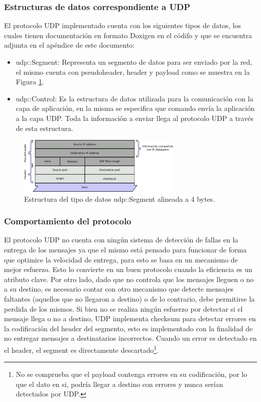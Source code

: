 \documentclass[10pt,a4paper]{article}
\begin{document}
\subsubsection{Estructuras de datos correspondiente a UDP}

El protocolo UDP implementado cuenta con los siguientes tipos de datos, los cuales tienen documentación en formato Doxigen en el códifo y que se encuentra adjunta en el apéndice de este documento:
\begin{itemize}
\item udp::Segment: Representa un segmento de datos para ser enviado por la red, el mismo cuenta con pseudoheader, header y payload como se muestra en la Figura \ref{figure: udp segment}.
\item udp::Control: Es la estructura de datos utilizada para la comunicación con la capa de aplicación, en la misma se especifica que comando envía la aplicación a la capa UDP. Toda la información a enviar llega al protocolo UDP a través de esta estructura.
\end{itemize}

\begin{figure}[!htb]
    \centering
    \includegraphics[width = 0.7\textwidth]{img/png/UDP-Segment.png}
    \caption{Estructura del tipo de datos udp::Segment alineada a 4 bytes.}
    \label{figure: udp segment}
\end{figure}

\subsubsection{Comportamiento del protocolo}

El protocolo UDP no cuenta con ningún sistema de detección de fallas en la entrega de los mensajes ya que el mismo está pensado para funcionar de forma que optimice la velocidad de entrega, para esto se basa en un mecanismo de mejor esfuerzo. Esto lo convierte en un buen protocolo cuando la eficiencia es un atributo clave. Por otro lado, dado que no controla que los mensajes lleguen o no a su destino, es necesario contar con otro mecanismo que detecte mensajes faltantes (aquellos que no llegaron a destino) o de lo contrario, debe permitirse la perdida de los mismos. Si bien no se realiza ningún esfuerzo por detectar si el mensaje llega o no a destino, UDP implementa checksum para detectar errores en la codificación del header del segmento, esto es implementado con la finalidad de no entregar mensajes a destinatarios incorrectos. Cuando un error es detectado en el header, el segment es directamente descartado\footnote{No se comprueba que el payload contenga errores en su codificación, por lo que el dato en si, podría llegar a destino con errores y nunca serían detectados por UDP.}.\\
\end{document}
